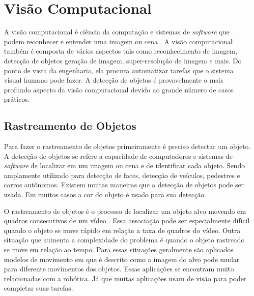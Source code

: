 \section{Visão Computacional}

A visão computacional é ciência da computação e sistemas de \textit{software} que podem reconhecer e entender uma imagem ou cena \cite{forsyth2002computer}.
A visão computacional também é composta de vários aspectos tais como reconhecimento de imagem, detecção de objetos geração de imagem, super-resolução de imagem e mais.
Do ponto de vista da engenharia, ela procura automatizar tarefas que o sistema visual humano pode fazer.
A detecção de objetos é provavelmente o mais profundo aspecto da visão computacional devido ao grande número de casos práticos.

\subsection{Rastreamento de Objetos}

Para fazer o rastreamento de objetos primeiramente é preciso detectar um objeto.
A detecção de objetos se refere a capacidade de computadores e sistemas de \textit{software} de localizar em um imagem ou cena e de identificar cada objeto.
Sendo amplamente utilizado para detecção de faces, detecção de veículos, pedestres e carros autônomos.
Existem muitas maneiras que a detecção de objetos pode ser usada. Em muitos casos a cor do objeto é usado para sua detecção.

O rastreamento de objetos é o processo de localizar um objeto alvo movendo em quadros consecutivos de um vídeo \cite{bascle1995region}. Essa associação pode ser especialmente difícil quando o objeto se move rápido em relação a taxa de quadros do vídeo. Outra situação que aumenta a complexidade do problema é quando o objeto rastreado se move em relação ao tempo. Para essas situações geralmente são aplicados modelos de movimento em que é descrito como a imagem do alvo pode mudar para diferente movimentos dos objetos. Essas aplicações se encontram muito relacionadas com a robótica. Já que muitas aplicações usam de visão para poder completar suas tarefas.